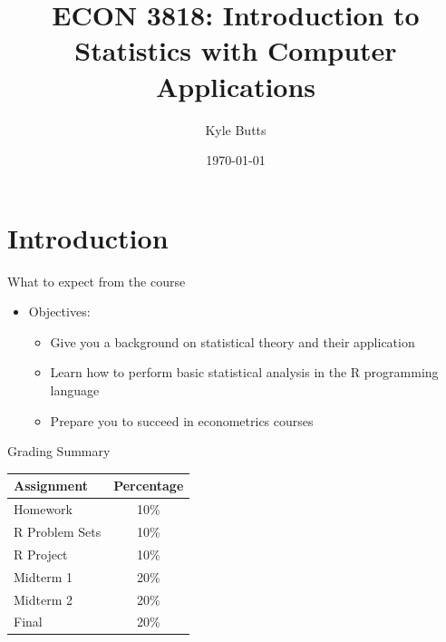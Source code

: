\documentclass{beamer}
\title{ECON 3818: Introduction to Statistics with Computer Applications}
\date{\today}
\author{Kyle Butts}
\begin{document}
\maketitle


\section{Introduction}
\begin{frame}{What to expect from the course}
	
	\begin{itemize}
		\item Objectives: 
            \begin{itemize}
		      	\item Give you a background on statistical theory and their application
		      	\item Learn how to perform basic statistical analysis in the R programming language
		      	\item Prepare you to succeed in econometrics courses  
            \end{itemize}
	\end{itemize}
\end{frame}


\begin{frame}{Grading Summary}
    \begin{center}
        \small{
            \begin{tabular}{| l | c |}
                \hline
                \textbf{Assignment} & \textbf{Percentage}\\ 
                \hline
                Homework & 10\% \\ \hline
                R Problem Sets & 10\% \\ \hline 
                R Project & 10\% \\ \hline 
                Midterm 1 & 20\% \\ \hline
                Midterm 2 & 20\%  \\ \hline
                Final & 20\%  \\ \hline
            \end{tabular}}
    \end{center}
\end{frame}
\end{document}
